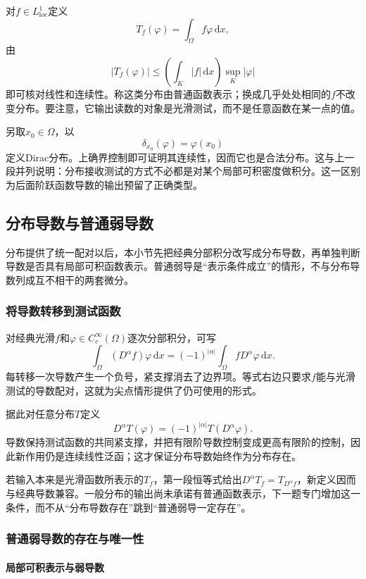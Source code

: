 对$f\in L^1_{\mathrm{loc}}$定义
\[
  T_f(\varphi)=\int_\Omega f\varphi\,\mathrm dx,
\]
由
\[
  |T_f(\varphi)|\le\left(\int_K|f|\,\mathrm dx\right)\sup_K|\varphi|
\]
即可核对线性和连续性。称这类分布由普通函数表示；换成几乎处处相同的$f$不改变分布。要注意，它输出读数的对象是光滑测试，而不是任意函数在某一点的值。

另取$x_0\in\Omega$，以
\[
  \delta_{x_0}(\varphi)=\varphi(x_0)
\]
定义Dirac分布。上确界控制即可证明其连续性，因而它也是合法分布。这与上一段并列说明：分布接收测试的方式不必都是对某个局部可积密度做积分。这一区别为后面阶跃函数导数的输出预留了正确类型。

\subsection{分布导数与普通弱导数}
\label{subsec:distribution-weak-derivatives}

分布提供了统一配对以后，本小节先把经典分部积分改写成分布导数，再单独判断导数是否具有局部可积函数表示。普通弱导是“表示条件成立”的情形，不与分布导数列成互不相干的两套微分。

\subsubsection{将导数转移到测试函数}
\label{subsubsec:transfer-derivative}

对经典光滑$f$和$\varphi\in C_c^\infty(\Omega)$逐次分部积分，可写
\[
  \int_\Omega (D^\alpha f)\varphi\,\mathrm dx
  =(-1)^{|\alpha|}\int_\Omega fD^\alpha\varphi\,\mathrm dx.
\]
每转移一次导数产生一个负号，紧支撑消去了边界项。等式右边只要求$f$能与光滑测试的导数配对，这就为尖点情形提供了仍可使用的形式。

据此对任意分布$T$定义
\[
  D^\alpha T(\varphi)=(-1)^{|\alpha|}T(D^\alpha\varphi).
\]
导数保持测试函数的共同紧支撑，并把有限阶导数控制变成更高有限阶的控制，因此新作用仍是连续线性泛函；这才保证分布导数始终作为分布存在。

若输入本来是光滑函数所表示的$T_f$，第一段恒等式给出$D^\alpha T_f=T_{D^\alpha f}$，新定义因而与经典导数兼容。一般分布的输出尚未承诺有普通函数表示，下一题专门增加这一条件，而不从“分布导数存在”跳到“普通弱导一定存在”。

\subsubsection{普通弱导数的存在与唯一性}
\label{subsubsec:weak-derivative-existence-uniqueness}

\paragraph{局部可积表示与弱导数}

